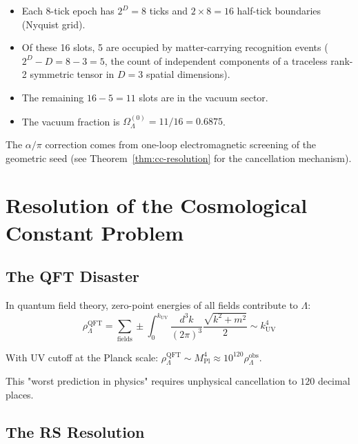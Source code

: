 \documentclass[12pt,a4paper]{article}
\theoremstyle{definition}
\theoremstyle{remark}
\begin{document}
\begin{itemize}
  \item Each 8-tick epoch has $2^D = 8$ ticks and $2 \times 8 = 16$
  half-tick boundaries (Nyquist grid).
  \item Of these 16 slots, 5 are occupied by matter-carrying
  recognition events ($2^D - D = 8 - 3 = 5$, the count of
  independent components of a traceless rank-2 symmetric tensor in
  $D = 3$ spatial dimensions).
  \item The remaining $16 - 5 = 11$ slots are in the vacuum sector.
  \item The vacuum fraction is $\Omega_\Lambda^{(0)} = 11/16 = 0.6875$.
\end{itemize}

The $\alpha/\pi$ correction comes from one-loop electromagnetic
screening of the geometric seed (see Theorem~\ref{thm:cc-resolution}
for the cancellation mechanism).

\section{Resolution of the Cosmological Constant Problem}

\subsection{The QFT Disaster}

In quantum field theory, zero-point energies of all fields contribute to $\Lambda$:
\begin{equation}
\rho_\Lambda^\mathrm{QFT} = \sum_\mathrm{fields} \pm \int_0^{k_\mathrm{UV}} \frac{d^3k}{(2\pi)^3} 
\frac{\sqrt{k^2 + m^2}}{2} \sim k_\mathrm{UV}^4
\end{equation}

With UV cutoff at the Planck scale: $\rho_\Lambda^\mathrm{QFT} \sim M_\mathrm{Pl}^4 \approx 10^{120} \rho_\Lambda^\mathrm{obs}$.

This "worst prediction in physics" requires unphysical cancellation to $120$ decimal places.

\subsection{The RS Resolution}
\end{document}
